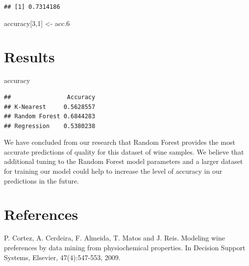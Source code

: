 \documentclass[
]{book}
\newenvironment{Shaded}{\begin{snugshade}}{\end{snugshade}}
\newcommand{\DecValTok}[1]{\textcolor[rgb]{0.00,0.00,0.81}{#1}}
\newcommand{\FloatTok}[1]{\textcolor[rgb]{0.00,0.00,0.81}{#1}}
\newcommand{\FunctionTok}[1]{\textcolor[rgb]{0.00,0.00,0.00}{#1}}
\newcommand{\NormalTok}[1]{#1}
\newcommand{\OtherTok}[1]{\textcolor[rgb]{0.56,0.35,0.01}{#1}}
\newcommand{\SpecialCharTok}[1]{\textcolor[rgb]{0.00,0.00,0.00}{#1}}
\begin{document}
\begin{verbatim}
## [1] 0.7314186
\end{verbatim}

\begin{Shaded}
\end{Shaded}

\begin{Shaded}
\begin{Highlighting}[]
\NormalTok{accuracy[}\DecValTok{3}\NormalTok{,}\DecValTok{1}\NormalTok{] }\OtherTok{\textless{}{-}}\NormalTok{ acc}\FloatTok{.6}
\end{Highlighting}
\end{Shaded}

\hypertarget{results}{%
\chapter{Results}\label{results}}

\begin{Shaded}
\begin{Highlighting}[]
\NormalTok{accuracy}
\end{Highlighting}
\end{Shaded}

\begin{verbatim}
##                Accuracy
## K-Nearest     0.5628557
## Random Forest 0.6844283
## Regression    0.5380238
\end{verbatim}

We have concluded from our research that Random Forest provides the most accurate predictions of quality for this dataset of wine samples. We believe that additional tuning to the Random Forest model parameters and a larger dataset for training our model could help to increase the level of accuracy in our predictions in the future.

\hypertarget{references}{%
\chapter{References}\label{references}}

P. Cortez, A. Cerdeira, F. Almeida, T. Matos and J. Reis.
Modeling wine preferences by data mining from physiochemical properties. In Decision Support Systems, Elsevier, 47(4):547-553, 2009.
\end{document}
